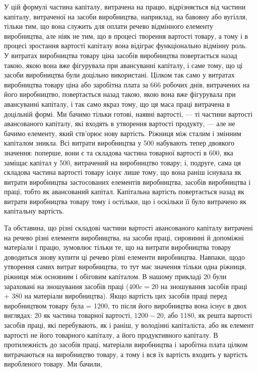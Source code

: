 
У цій формулі частина капіталу, витрачена на працю, відрізняється
від частини капіталу, витраченої на засоби виробництва,
наприклад, на бавовну або вугілля, тільки тим, що вона
служить для оплати речево відмінного елементу виробництва,
але ніяк не тим, що в процесі творення вартості товару, а тому
і в процесі зростання вартості капіталу вона відіграє функціонально
відмінну роль. У витратах виробництва товару ціна засобів
виробництва повертається назад такою, якою вона вже
фігурувала при авансуванні капіталу, і саме тому, що ці засоби
виробництва були доцільно використані. Цілком так само у витратах
виробництва товару ціна або заробітна плата за 666
робочих днів, витрачених на його виробництво, повертається
назад такою, якою вона вже фігурувала при авансуванні капіталу,
і так само якраз тому, що ця маса праці витрачена в доцільній
формі. Ми бачимо тільки готові, наявні вартості, — ті
частини вартості авансованого капіталу, які входять в утворення
вартості продукту, — але не бачимо елементу, який ств'орює
нову вартість. Ріжниця між сталим і змінним капіталом зникла.
Всі витрати виробництва у 500 набувають
тепер двоякого значення: поперше, вони є та складова частина
товарної вартості в 600, яка заміщає капітал
у 500, витрачений на виробництво товару;
і, подруге, сама ця складова частина вартості товару існує лише
тому, що вона раніш існувала як витрати виробництва застосованих
елементів виробництва, засобів виробництва і праці, тобто
як авансований капітал. Капітальна вартість повертається назад
як витрати виробництва товару тому і остільки, що і оскільки
її було витрачено як капітальну вартість.

Та обставина, що різні складові частини вартості авансованого
капіталу витрачені на речево різні елементи виробництва,
на засоби праці, сировинні й допоміжні матеріали і працю,
зумовлює тільки те, що на витрати виробництва товару доводиться
знову купити ці речево різні елементи виробництва.
Навпаки, щодо утворення самих витрат виробництва, то тут має
значення тільки одна ріжниця, ріжниця між основним і обіговим
капіталом. В нашому прикладі 20 були зараховані
на зношування засобів праці ($400 c = 20$
на зношування засобів праці + 380 на
матеріали виробництва). Якщо вартість цих засобів праці перед
виробництвом товару була = 1200, то після
його виробництва вона існує в двох виглядах: 20
як частина товарної вартості, $1200-20$, або 1180,
як решта вартості засобів праці, які перебувають, як і раніш,
у володінні капіталіста, або як елемент вартості не його
товарного капіталу, а його продуктивного капіталу. В протилежність
до засобів праці, матеріали виробництва і заробітна плата
цілком витрачаються на виробництво товару, а тому і вся їх
вартість входить у вартість виробленого товару. Ми бачили,
\parbreak{}  %
